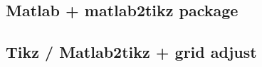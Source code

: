 \documentclass[10pt,a4paper,oneside,onecolumn]{article}
\begin{document}
\subsection{Matlab + matlab2tikz package}
\begin{center}

\end{center}

\newpage
\subsection{Tikz / Matlab2tikz + grid adjust}
\begin{center}

\\

\end{center}
\newpage
\end{document}
